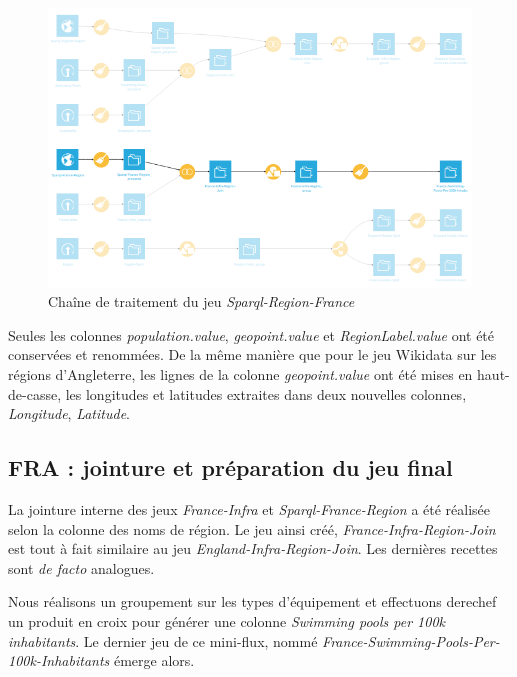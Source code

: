 \documentclass[hidelinks, 12pt]{report}
\begin{document}
\begin{center}
	\begin{figure}[H]
		\centering
		\setlength{\belowcaptionskip}{-35pt}
		\includegraphics[scale=0.5]{images/flow-swim-fra-sparql.png}
		\caption{Chaîne de traitement du jeu \textit{Sparql-Region-France}}
	\end{figure}
\end{center}

Seules les colonnes \textit{population.value}, \textit{geopoint.value} et \textit{RegionLabel.value} ont été conservées et renommées. De la même manière que pour le jeu Wikidata sur les régions d'Angleterre, les lignes de la colonne \textit{geopoint.value} ont été mises en haut-de-casse, les longitudes et latitudes extraites dans deux nouvelles colonnes, \textit{Longitude}, \textit{Latitude}.





%





\subsection{FRA : jointure et préparation du jeu final}

La jointure interne des jeux \textit{France-Infra} et \textit{Sparql-France-Region} a été réalisée selon la colonne des noms de région. Le jeu ainsi créé, \textit{France-Infra-Region-Join} est tout à fait similaire au jeu \textit{England-Infra-Region-Join}. Les dernières recettes sont \textit{de facto} analogues.

Nous réalisons un groupement sur les types d'équipement et effectuons derechef un produit en croix pour générer une colonne \textit{Swimming pools per 100k inhabitants}. Le dernier jeu de ce mini-flux, nommé \textit{France-Swimming-Pools-Per-100k-Inhabitants} émerge alors. 
\end{document}
